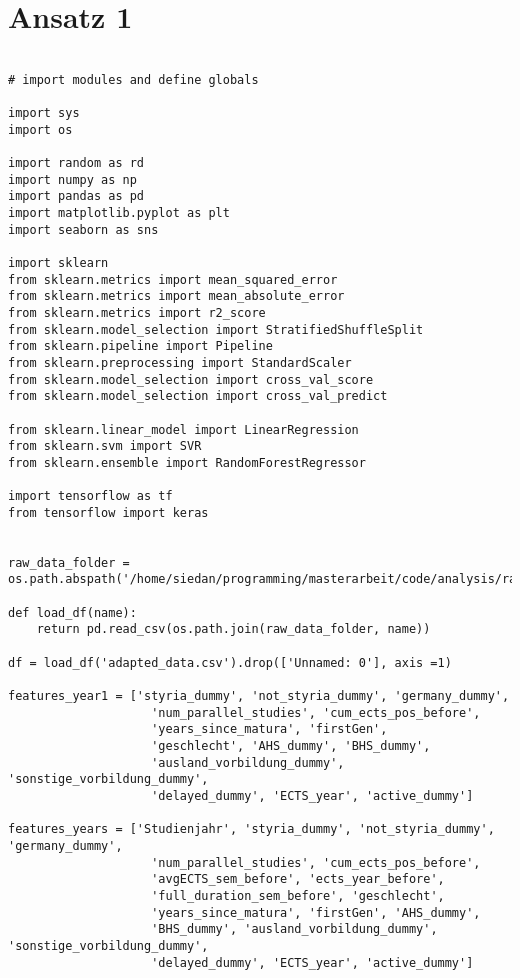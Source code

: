 \section{Ansatz 1}
\begin{lstlisting}

# import modules and define globals

import sys
import os

import random as rd
import numpy as np
import pandas as pd
import matplotlib.pyplot as plt
import seaborn as sns

import sklearn
from sklearn.metrics import mean_squared_error
from sklearn.metrics import mean_absolute_error
from sklearn.metrics import r2_score
from sklearn.model_selection import StratifiedShuffleSplit
from sklearn.pipeline import Pipeline
from sklearn.preprocessing import StandardScaler
from sklearn.model_selection import cross_val_score
from sklearn.model_selection import cross_val_predict

from sklearn.linear_model import LinearRegression
from sklearn.svm import SVR
from sklearn.ensemble import RandomForestRegressor

import tensorflow as tf
from tensorflow import keras


raw_data_folder = os.path.abspath('/home/siedan/programming/masterarbeit/code/analysis/raw_data')

def load_df(name):
    return pd.read_csv(os.path.join(raw_data_folder, name))

df = load_df('adapted_data.csv').drop(['Unnamed: 0'], axis =1)

features_year1 = ['styria_dummy', 'not_styria_dummy', 'germany_dummy',
                    'num_parallel_studies', 'cum_ects_pos_before',
                    'years_since_matura', 'firstGen',
                    'geschlecht', 'AHS_dummy', 'BHS_dummy',
                    'ausland_vorbildung_dummy', 'sonstige_vorbildung_dummy',
                    'delayed_dummy', 'ECTS_year', 'active_dummy']

features_years = ['Studienjahr', 'styria_dummy', 'not_styria_dummy', 'germany_dummy',
                    'num_parallel_studies', 'cum_ects_pos_before',
                    'avgECTS_sem_before', 'ects_year_before',
                    'full_duration_sem_before', 'geschlecht',
                    'years_since_matura', 'firstGen', 'AHS_dummy',
                    'BHS_dummy', 'ausland_vorbildung_dummy', 'sonstige_vorbildung_dummy',
                    'delayed_dummy', 'ECTS_year', 'active_dummy']


\end{lstlisting}
